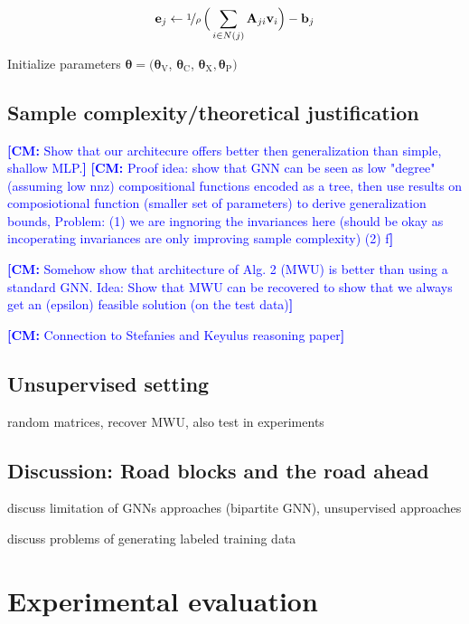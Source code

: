 \documentclass[11pt, DIV=12]{scrartcl}
\theoremstyle{definition}
\renewcommand{\vec}[1]{\mathbf{#1}}
\newcommand{\cm}[1]{{{\textcolor{blue}{\textbf{[CM:} {#1}\textbf{]}}}}}
\begin{document}
\begin{equation}\label{err}
\vec{e}_j \leftarrow \nicefrac{1}{\rho}\,\Big(\sum_{i \in N(j)} \vec{A}_{ji}  \vec{v}_i \Big) - \vec{b}_j   
\end{equation}



Initialize parameters $\boldsymbol{\theta} = (\boldsymbol{\theta}_{\text{V}}$, $\boldsymbol{\theta}_{\text{C}}$, $\boldsymbol{\theta}_{\text{X}}, \boldsymbol{\theta}_{\text{P}})$



\subsection{Sample complexity/theoretical justification}

\cm{Show that our architecure offers better then generalization than simple, shallow MLP.}
\cm{Proof idea: show that GNN can be seen as low "degree" (assuming low nnz) compositional functions encoded as a tree, then use results on composiotional function (smaller set of parameters) to derive generalization bounds, Problem: (1) we are ingnoring the invariances here (should be okay as incoperating invariances are only improving sample complexity) (2) f}


\cm{Somehow show that architecture of Alg. 2 (MWU) is better than using a standard GNN. Idea: Show that MWU can be recovered to show that we always get an (epsilon) feasible solution (on the test data)}

\cm{Connection to Stefanies and Keyulus reasoning paper}

\subsection{Unsupervised setting}

random matrices, recover MWU, also test in experiments


\subsection{Discussion: Road blocks and the road ahead}
						
discuss limitation of GNNs approaches (bipartite GNN), unsupervised approaches

discuss problems of generating labeled training data

\section{Experimental evaluation}
\end{document}
